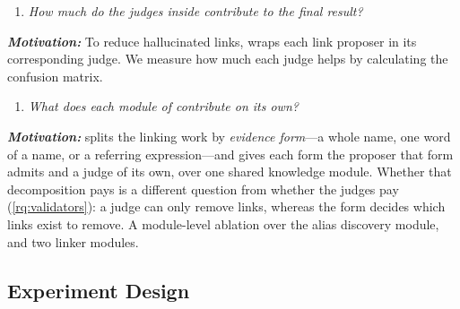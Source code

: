 
\begin{enumerate}[leftmargin=*, labelindent=0em, label=\textbf{RQ\arabic*}:, ref=RQ\arabic*, series=researchQuestions, resume]
    \item \label{rq:validators} \emph{How much do the judges inside \approach contribute to the final result?}
\end{enumerate}
\emph{\textbf{Motivation:}}
To reduce hallucinated links, \approach{} wraps each link proposer in its corresponding \evidenceBacked judge. 
We measure how much each judge helps by calculating the confusion matrix.


\begin{enumerate}[leftmargin=*, labelindent=0em, label=\textbf{RQ\arabic*}:, ref=RQ\arabic*, series=researchQuestions, resume]
    \item \label{rq:ablation} \emph{What does each module of \approach{} contribute on its own?}
\end{enumerate}
\emph{\textbf{Motivation:}}
\approach{} splits the linking work by \emph{evidence form}---a whole name, one word of a name, or a referring expression---and gives each form the proposer that form admits and a judge of its own, over one shared knowledge module.
Whether that decomposition pays is a different question from whether the judges pay (\ref{rq:validators}): a judge can only remove links, whereas the form decides which links exist to remove.
A module-level ablation over the alias discovery module, and two linker modules.

\subsection{Experiment Design}
\label{sec:exp-design}

